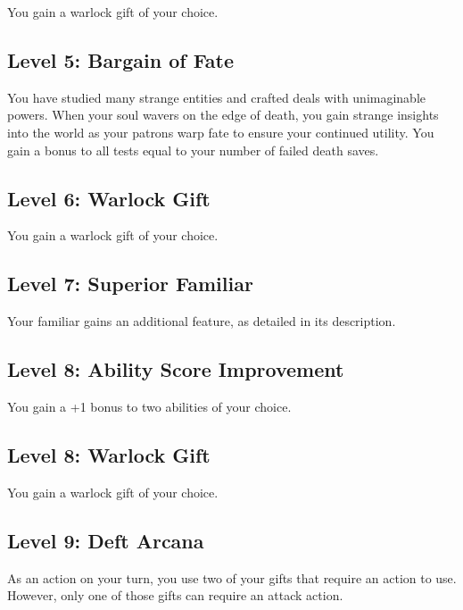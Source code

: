 \documentclass[12pt,letterpaper,twocolumn,openany,nodeprecatedcode,bg=none]{dndbook}
\begin{document}
You gain a warlock gift of your choice.

\subsection{Level 5: Bargain of Fate}\label{level-5-bargain-of-fate}

You have studied many strange entities and crafted deals with
unimaginable powers. When your soul wavers on the edge of death, you
gain strange insights into the world as your patrons warp fate to ensure
your continued utility. You gain a bonus to all tests equal to your
number of failed death saves.

\subsection{Level 6: Warlock Gift}\label{level-6-warlock-gift}

You gain a warlock gift of your choice.

\subsection{Level 7: Superior Familiar}\label{level-7-superior-familiar}

Your familiar gains an additional feature, as detailed in its
description.

\subsection{Level 8: Ability Score
Improvement}\label{level-8-ability-score-improvement}

You gain a +1 bonus to two abilities of your choice.

\subsection{Level 8: Warlock Gift}\label{level-8-warlock-gift}

You gain a warlock gift of your choice.

\subsection{Level 9: Deft Arcana}\label{level-9-deft-arcana}

As an action on your turn, you use two of your gifts that require an
action to use. However, only one of those gifts can require an attack
action.
\end{document}
